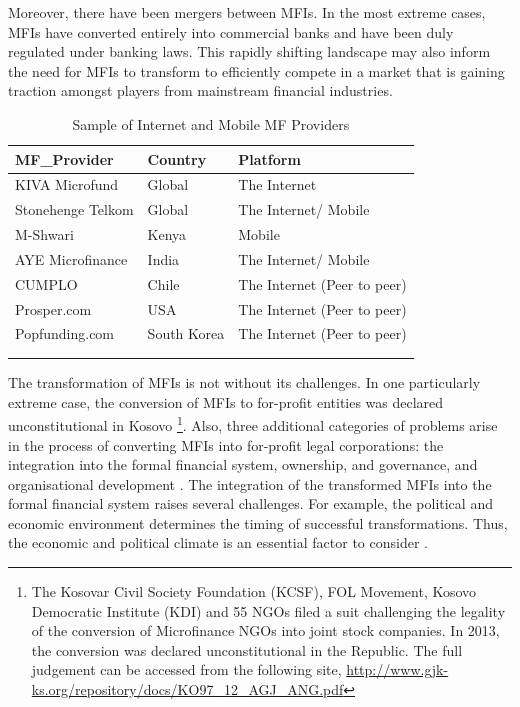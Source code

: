 \documentclass[a4paper,nobind]{templates/ociamthesis}
\begin{document}
Moreover, there have been mergers between MFIs. In the most extreme cases, MFIs have converted entirely into commercial banks and have been duly regulated under banking laws. This rapidly shifting landscape may also inform the need for MFIs to transform to efficiently compete in a market that is gaining traction amongst players from mainstream financial industries.

\begin{table}

\caption{\label{tab:unnamed-chunk-4}Sample of Internet and Mobile MF Providers}
\centering
\fontsize{8}{10}\selectfont
\begin{tabu} to 
\toprule
MF\_Provider & Country & Platform\\
\midrule
KIVA Microfund & Global & The Internet\\
Stonehenge Telkom & Global & The Internet/ Mobile\\
M-Shwari & Kenya & Mobile\\
AYE Microfinance & India & The Internet/ Mobile\\
CUMPLO & Chile & The Internet (Peer to peer)\\
\addlinespace
Prosper.com & USA & The Internet (Peer to peer)\\
Popfunding.com & South Korea & The Internet (Peer to peer)\\
\bottomrule
{}\\
\\
\end{tabu}
\end{table}

The transformation of MFIs is not without its challenges. In one particularly extreme case, the conversion of MFIs to for-profit entities was declared unconstitutional in Kosovo \autocite{hasani2013ustav} \footnote{The Kosovar Civil Society Foundation (KCSF), FOL Movement, Kosovo Democratic Institute (KDI) and 55 NGOs filed a suit challenging the legality of the conversion of Microfinance NGOs into joint stock companies. In 2013, the conversion was declared unconstitutional in the Republic. The full judgement can be accessed from the following site, \url{http://www.gjk-ks.org/repository/docs/KO97_12_AGJ_ANG.pdf}}. Also, three additional categories of problems arise in the process of converting MFIs into for-profit legal corporations: the integration into the formal financial system, ownership, and governance, and organisational development \autocite{campion1999institutional}. The integration of the transformed MFIs into the formal financial system raises several challenges. For example, the political and economic environment determines the timing of successful transformations. Thus, the economic and political climate is an essential factor to consider \autocite{kenya2012transforming}.
\end{document}
